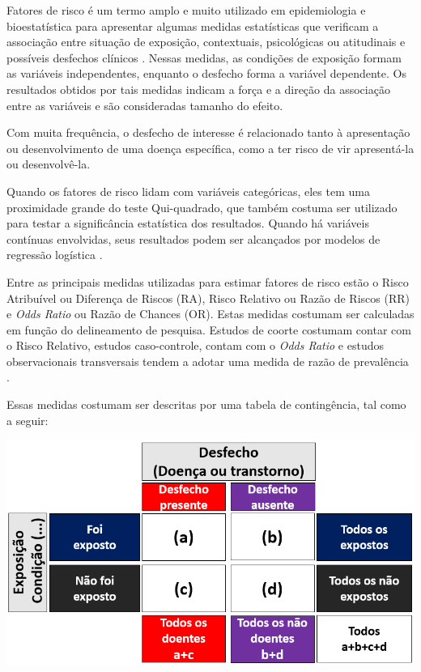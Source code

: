 \documentclass[
]{book}
\begin{document}
Fatores de risco é um termo amplo e muito utilizado em epidemiologia e bioestatística para apresentar algumas medidas estatísticas que verificam a associação entre situação de exposição, contextuais, psicológicas ou atitudinais e possíveis desfechos clínicos \citep{Wagener1998}. Nessas medidas, as condições de exposição formam as variáveis independentes, enquanto o desfecho forma a variável dependente. Os resultados obtidos por tais medidas indicam a força e a direção da associação entre as variáveis e são consideradas tamanho do efeito.

Com muita frequência, o desfecho de interesse é relacionado tanto à apresentação ou desenvolvimento de uma doença específica, como a ter risco de vir apresentá-la ou desenvolvê-la.

Quando os fatores de risco lidam com variáveis categóricas, eles tem uma proximidade grande do teste Qui-quadrado, que também costuma ser utilizado para testar a significância estatística dos resultados. Quando há variáveis contínuas envolvidas, seus resultados podem ser alcançados por modelos de regressão logística \citep{DeMaris1995}.

Entre as principais medidas utilizadas para estimar fatores de risco estão o Risco Atribuível ou Diferença de Riscos (RA), Risco Relativo ou Razão de Riscos (RR) e \emph{Odds Ratio} ou Razão de Chances (OR). Estas medidas costumam ser calculadas em função do delineamento de pesquisa. Estudos de coorte costumam contar com o Risco Relativo, estudos caso-controle, contam com o \emph{Odds Ratio} e estudos observacionais transversais tendem a adotar uma medida de razão de prevalência \citep{Endruweit2019}.

Essas medidas costumam ser descritas por uma tabela de contingência, tal como a seguir:

\includegraphics{./img/cap_risco_tabela_decisao.png}
\end{document}

